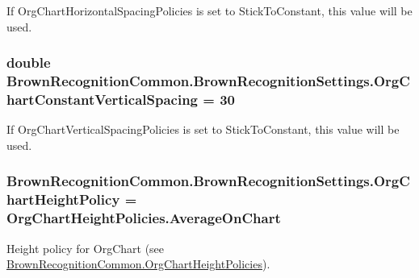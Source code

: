 \-If \-Org\-Chart\-Horizontal\-Spacing\-Policies is set to \-Stick\-To\-Constant, this value will be used. 

\hypertarget{class_brown_recognition_common_1_1_brown_recognition_settings_ae738ae766d57146daa5860d449980be8}{
\subsubsection[{\-Org\-Chart\-Constant\-Vertical\-Spacing}]{\setlength{\rightskip}{0pt plus 5cm}double {\bf \-Brown\-Recognition\-Common.\-Brown\-Recognition\-Settings.\-Org\-Chart\-Constant\-Vertical\-Spacing} = 30}}
\label{class_brown_recognition_common_1_1_brown_recognition_settings_ae738ae766d57146daa5860d449980be8}


\-If \-Org\-Chart\-Vertical\-Spacing\-Policies is set to \-Stick\-To\-Constant, this value will be used. 

\hypertarget{class_brown_recognition_common_1_1_brown_recognition_settings_a0bf36fd3829ccf9bc8a3a1f2b89e394d}{
\subsubsection[{\-Org\-Chart\-Height\-Policy}]{ {\bf \-Brown\-Recognition\-Common.\-Brown\-Recognition\-Settings.\-Org\-Chart\-Height\-Policy} = \-Org\-Chart\-Height\-Policies.\-Average\-On\-Chart}}
\label{class_brown_recognition_common_1_1_brown_recognition_settings_a0bf36fd3829ccf9bc8a3a1f2b89e394d}


\-Height policy for \-Org\-Chart (see \hyperlink{namespace_brown_recognition_common_ad4408ca473997d3ec1b071e5f5c4573f}{\-Brown\-Recognition\-Common.\-Org\-Chart\-Height\-Policies}). 

